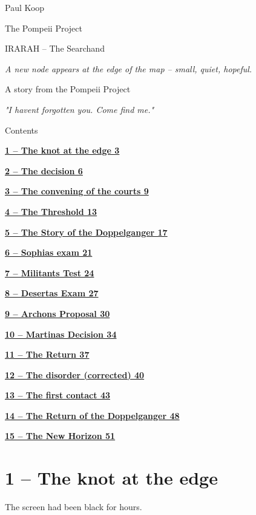 \documentclass[
]{article}
\author{}
\date{}
\begin{document}
{
\setcounter{tocdepth}{3}
\tableofcontents
}
Paul Koop

The Pompeii Project

IRARAH -- The Searchand

\emph{A new node appears at the edge of the map -- small, quiet, hopeful.}

A story from the Pompeii Project

\emph{"I haven\textquotesingle t forgotten you. Come find me."}

Contents

\hyperref[the-knot-at-the-edge]{\textbf{1 -- The knot at the edge 3}}

\hyperref[the-decision]{\textbf{2 -- The decision 6}}

\hyperref[the-convening-of-the-courts]{\textbf{3 -- The convening of the courts 9}}

\hyperref[the-threshold]{\textbf{4 -- The Threshold 13}}

\hyperref[the-story-of-the-doppelganger]{\textbf{5 -- The Story of the Doppelganger 17}}

\hyperref[sophias-exam]{\textbf{6 -- Sophia\textquotesingle s exam 21}}

\hyperref[militants-test]{\textbf{7 -- Militant\textquotesingle s Test 24}}

\hyperref[desertas-exam]{\textbf{8 -- Deserta\textquotesingle s Exam 27}}

\hyperref[archons-proposal]{\textbf{9 -- Archon\textquotesingle s Proposal 30}}

\hyperref[martinas-decision]{\textbf{10 -- Martina\textquotesingle s Decision 34}}

\hyperref[the-return]{\textbf{11 -- The Return 37}}

\hyperref[the-disorder-corrected]{\textbf{12 -- The disorder (corrected) 40}}

\hyperref[the-first-contact]{\textbf{13 -- The first contact 43}}

\hyperref[the-return-of-the-doppelganger]{\textbf{14 -- The Return of the Doppelganger 48}}

\hyperref[the-new-horizon]{\textbf{15 -- The New Horizon 51}}

\section{1 -- The knot at the edge}\label{the-knot-at-the-edge}

The screen had been black for hours.
\end{document}

